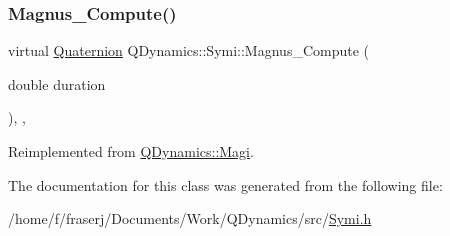 \subsubsection{\texorpdfstring{Magnus\+\_\+\+Compute()}{Magnus\_Compute()}}
{\footnotesize\ttfamily virtual \hyperlink{classQDynamics_1_1Quaternion}{Quaternion} Q\+Dynamics\+::\+Symi\+::\+Magnus\+\_\+\+Compute (\begin{DoxyParamCaption}\item[{double}]{duration }\end{DoxyParamCaption})\hspace{0.3cm}{\ttfamily [inline]}, {\ttfamily [protected]}, {\ttfamily [virtual]}}



Reimplemented from \hyperlink{classQDynamics_1_1Magi_aadacdb3581a42babd5e1aa9ada6c77ee}{Q\+Dynamics\+::\+Magi}.



The documentation for this class was generated from the following file\+:\begin{DoxyCompactItemize}
\item 
/home/f/fraserj/\+Documents/\+Work/\+Q\+Dynamics/src/\hyperlink{Symi_8h}{Symi.\+h}\end{DoxyCompactItemize}
